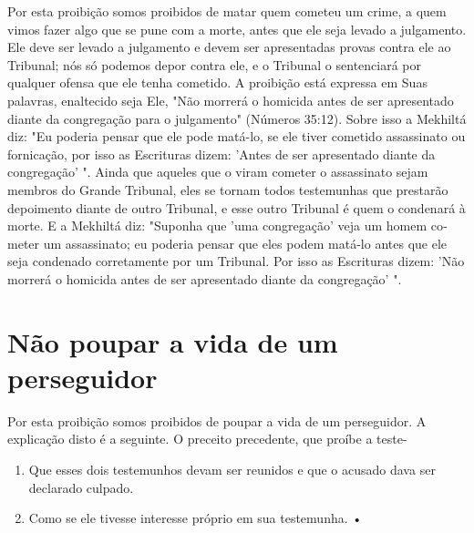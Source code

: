 \begin{itemize}
\begin{enumrate}
\begin{itemize}
\begin{itemize}
\begin{itemize}
Por esta proibição somos proibidos de matar quem cometeu um cri­me, a
quem vimos fazer algo que se pune com a morte, antes que ele seja levado
a julgamento. Ele deve ser levado a julgamento e devem ser apresentadas
provas contra ele ao Tribunal; nós só podemos depor contra ele, e o
Tribunal o senten­ciará por qualquer ofensa que ele tenha cometido. A
proibição está expressa em Suas palavras, enaltecido seja Ele, "Não
morrerá o homicida antes de ser apresen­tado diante da congregação para
o julgamento" (Números 35:12). Sobre isso a Mek­hiltá diz: "Eu poderia
pensar que ele pode matá-lo, se ele tiver cometido assassi­nato ou
fornicação, por isso as Escrituras dizem: 'Antes de ser apresentado
diante da congregação' ". Ainda que aqueles que o viram cometer o
assassinato sejam membros do Grande Tribunal, eles se tornam todos
testemunhas que prestarão depoimento diante de outro Tribunal, e esse
outro Tribunal é quem o condenará à morte. E a Mekhiltá diz: "Suponha
que 'uma congregação' veja um homem co­meter um assassinato; eu poderia
pensar que eles podem matá-lo antes que ele seja condenado corretamente
por um Tribunal. Por isso as Escrituras dizem: 'Não morrerá o homicida
antes de ser apresentado diante da congregação' ".

\section{Não poupar a vida de um perseguidor}

Por esta proibição somos proibidos de poupar a vida de um perse­guidor.
A explicação disto é a seguinte. O preceito precedente, que proíbe a
teste-


\begin{enumerate}
\def\labelenumi{\arabic{enumi}.}
\setcounter{enumi}{417}
\item
 
 Que esses dois testemunhos devam ser reunidos e que o acusado dava ser
 declarado culpado.
 
\item
 
 Como se ele tivesse interesse próprio em sua testemunha. •
 
\end{enumerate}




\end{itemize}
\end{itemize}
\end{itemize}
\end{enumrate}
\end{itemize}
